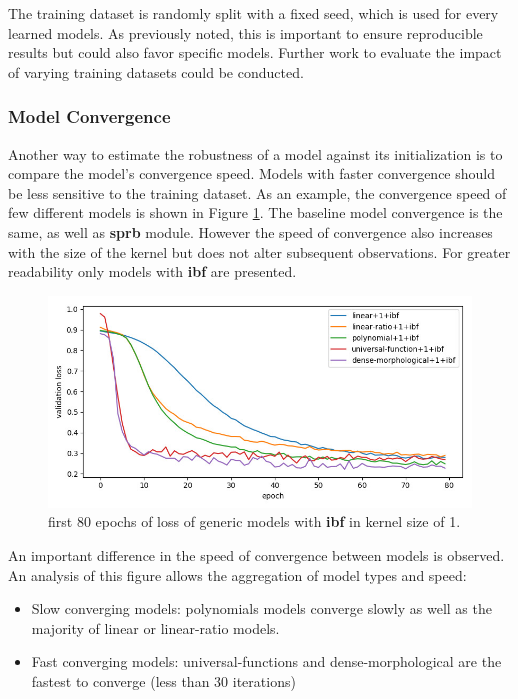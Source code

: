 \documentclass[../thesis.tex]{subfiles}
\begin{document}
	The training dataset is randomly split with a fixed seed, which is used for every learned models. As previously noted, this is important to ensure reproducible results but could also favor specific models. Further work to evaluate the impact of varying training datasets could be conducted.
	
    \newpage
	\subsubsection{Model Convergence}
	
	Another way to estimate the robustness of a model against its initialization is to compare the model’s convergence speed. Models with faster convergence should be less sensitive to the training dataset. As an example, the convergence speed of few different models is shown in Figure \ref{fig:all-loss}. The baseline model convergence is the same, as well as \textbf{sprb} module. However the speed of convergence also increases with the size of the kernel but does not alter subsequent observations. For greater readability only models with \textbf{ibf} are presented.
	
	\begin{figure}[H]
		\centering
		\includegraphics[width=\linewidth]{img/idx/model-convergence}
		\caption{first 80 epochs of loss of generic models with \textbf{ibf} in kernel size of 1.}
		\label{fig:all-loss}
	\end{figure}
	
	An important difference in the speed of convergence between models is observed.
	An analysis of this figure allows the aggregation of model types and speed: 
	
	\begin{itemize}
		\item Slow converging models: polynomials models converge slowly as well as the majority of linear or linear-ratio models.
		\item Fast converging models: universal-functions and dense-morphological are the fastest to converge (less than 30 iterations)
	\end{itemize}
	
\end{document}
